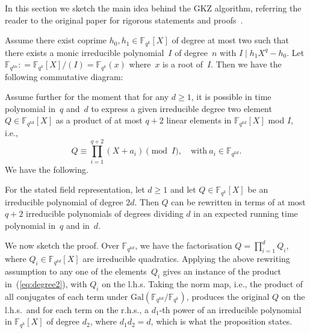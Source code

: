 \documentclass[11pt]{llncs}
\newcommand{\F}{\mathbb F}
\newcommand{\defeq}{\mathrel{\mathop:}=}
\begin{document}
In this section we sketch the main idea behind the GKZ algorithm, referring the reader to the original paper for rigorous statements and 
proofs~\cite{GKZ18}. 

Assume there exist coprime $h_0, h_1 \in \F_{q^k}[X]$ of degree at most two such that there exists a monic irreducible 
polynomial~$I$ of degree~$n$ with $I \mid h_1 X^q - h_0$.  Let $\F_{q^{kn}} \defeq \F_{q^k}[X]/(I) = \F_{q^k}(x)$ where~$x$
is a root of~$I$.  Then we have the following commutative diagram:
\begin{center}\end{center}
Assume further for the moment that for any $d \ge 1$, it is possible in time polynomial in~$q$ and~$d$ to express a given irreducible degree
two element $Q \in \F_{q^{kd}}[X]$ as a product of at most $q+2$ linear elements in $\F_{q^{kd}}[X]$ mod $I$, i.e.,
\begin{equation}\label{eq:degree2}
Q \equiv \prod_{i=1}^{q+2} (X + a_i) \pmod{I}, \quad \text{with} \ a_i \in \F_{q^{kd}} .
\end{equation}
We have the following.
\begin{proposition}{\cite[Prop.~3.2]{GKZ18}}\label{prop:buildingblock}
For the stated field representation, let $d \ge 1$ and let $Q \in \F_{q^{k}}[X]$ be an irreducible polynomial of degree $2d$. Then $Q$ can be 
rewritten in terms of at most $q + 2$ irreducible polynomials of degrees dividing $d$ in an expected running time polynomial in~$q$ and in~$d$.
\end{proposition}

We now sketch the proof. Over $\F_{q^{kd}}$, we have the factorisation $Q = \prod_{i=1}^{d} Q_i$, where $Q_i \in \F_{q^{kd}}[X]$
are irreducible quadratics. Applying the above rewriting assumption to any one of the elements~$Q_i$ gives an instance of the product 
in~(\ref{eq:degree2}), with $Q_i$ on the l.h.s.  Taking the norm map, i.e., the product of all conjugates of each term under $\text{Gal}(\F_{q^{kd}}/\F_{q^{k}})$,
produces the original $Q$ on the l.h.s.\ and for each term on the r.h.s., a $d_1$-th power of an irreducible polynomial 
in $\F_{q^k}[X]$ of degree $d_2$, where $d_1d_2 = d$, which is what the proposition states.
\end{document}
